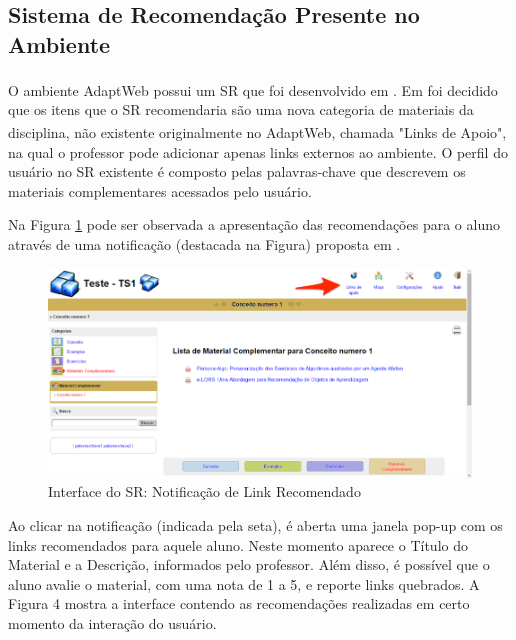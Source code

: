 \subsection{Sistema de Recomendação Presente no Ambiente}

O ambiente AdaptWeb\textsuperscript{\textregistered} possui um SR que foi desenvolvido em . Em 
foi decidido que os itens que o SR recomendaria são uma nova categoria de materiais da disciplina, não existente
originalmente no AdaptWeb\textsuperscript{\textregistered}, chamada "Links de Apoio", na qual o professor pode adicionar
apenas links externos ao ambiente. O perfil do usuário no SR existente é composto pelas palavras-chave que descrevem os
materiais complementares acessados pelo usuário.

Na Figura \ref{fig:adaptweb-notificacao-recomendacao} pode ser observada a apresentação das recomendações para o aluno
através de uma notificação (destacada na Figura) proposta em .

\begin{figure}[htb]
  \caption{\label{fig:adaptweb-notificacao-recomendacao}Interface do SR: Notificação de Link Recomendado}
  \begin{center}
      \includegraphics[scale=1.0]{./Figuras/adaptweb-notificacao-recomendacao.png}
  \end{center}
\end{figure}

Ao clicar na notificação (indicada pela seta), é aberta uma janela pop-up com os links recomendados para aquele aluno.
Neste momento aparece o Título do Material e a Descrição, informados pelo professor. Além disso, é possível que o aluno
avalie o material, com uma nota de 1 a 5, e reporte links quebrados. A Figura 4 mostra a interface contendo as
recomendações realizadas em certo momento da interação do usuário.


